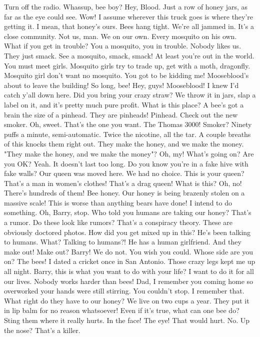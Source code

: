 \documentclass[a4paper,12pt]{article}
\begin{document}
Turn off the radio.
Whassup, bee boy?
Hey, Blood.
Just a row of honey jars, as far as the eye could see.
Wow!
I assume wherever this truck goes is where they're getting it. I mean, that honey's ours.
Bees hang tight. We're all jammed in.
It's a close community.
Not us, man. We on our own. Every mosquito on his own.
What if you get in trouble?
You a mosquito, you in trouble. Nobody likes us. They just smack. See a mosquito, smack, smack!
At least you're out in the world. You must meet girls.
Mosquito girls try to trade up, get with a moth, dragonfly. Mosquito girl don't want no mosquito.
You got to be kidding me!
Mooseblood's about to leave the building! So long, bee!
Hey, guys!
Mooseblood!
I knew I'd catch y'all down here.
Did you bring your crazy straw?
We throw it in jars, slap a label on it, and it's pretty much pure profit.
What is this place?
A bee's got a brain the size of a pinhead.
They are pinheads!
Pinhead.
Check out the new smoker.
Oh, sweet. That's the one you want. The Thomas 3000!
Smoker?
Ninety puffs a minute, semi-automatic. Twice the nicotine, all the tar. A couple breaths of this knocks them right out.
They make the honey, and we make the money.
"They make the honey, and we make the money"?
Oh, my!
What's going on? Are you OK?
Yeah. It doesn't last too long.
Do you know you're in a fake hive with fake walls?
Our queen was moved here. We had no choice.
This is your queen? That's a man in women's clothes! That's a drag queen!
What is this?
Oh, no!
There's hundreds of them!
Bee honey.
Our honey is being brazenly stolen on a massive scale!
This is worse than anything bears have done! I intend to do something.
Oh, Barry, stop.
Who told you humans are taking our honey? That's a rumor.
Do these look like rumors?
That's a conspiracy theory. These are obviously doctored photos. How did you get mixed up in this?
He's been talking to humans.
What? Talking to humans?!
He has a human girlfriend. And they make out!
Make out? Barry!
We do not.
You wish you could.
Whose side are you on?
The bees!
I dated a cricket once in San Antonio. Those crazy legs kept me up all night.
Barry, this is what you want to do with your life?
I want to do it for all our lives. Nobody works harder than bees!
Dad, I remember you coming home so overworked
your hands were still stirring. You couldn't stop.
I remember that.
What right do they have to our honey?
We live on two cups a year. They put it in lip balm for no reason whatsoever!
Even if it's true, what can one bee do?
Sting them where it really hurts.
In the face! The eye!
That would hurt.
No.
Up the nose? That's a killer.
\end{document}
